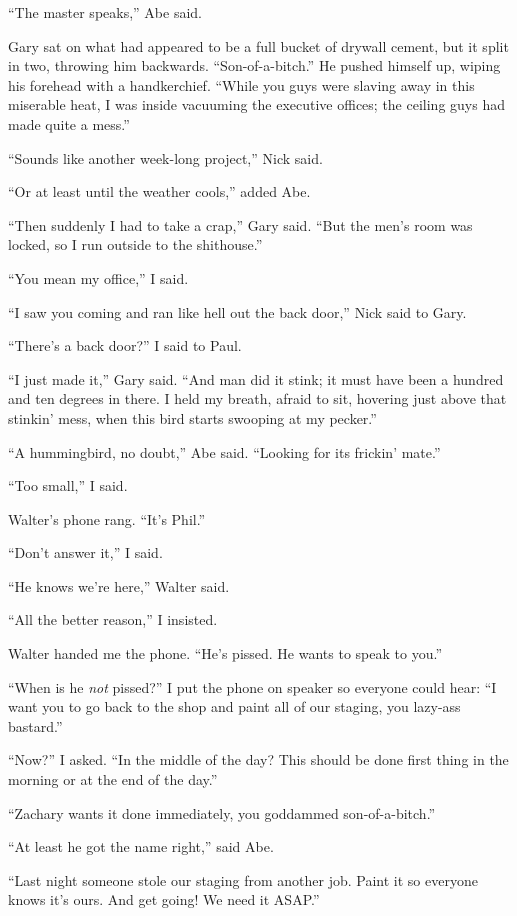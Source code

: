 ``The master speaks,'' Abe said.

Gary sat on what had appeared to be a full bucket of drywall cement, but
it split in two, throwing him backwards. ``Son-of-a-bitch.'' He pushed
himself up, wiping his forehead with a handkerchief. ``While you guys
were slaving away in this miserable heat, I was inside vacuuming the
executive offices; the ceiling guys had made quite a mess.''

``Sounds like another week-long project,'' Nick said.

``Or at least until the weather cools,'' added Abe.

``Then suddenly I had to take a crap,'' Gary said. ``But the men's room
was locked, so I run outside to the shithouse.''

``You mean my office,'' I said.

``I saw you coming and ran like hell out the back door,'' Nick said to
Gary.

``There's a back door?'' I said to Paul.

``I just made it,'' Gary said. ``And man did it stink; it must have been
a hundred and ten degrees in there. I held my breath, afraid to sit,
hovering just above that stinkin' mess, when this bird starts swooping
at my pecker.''

``A hummingbird, no doubt,'' Abe said. ``Looking for its frickin'
mate.''

``Too small,'' I said.

Walter's phone rang. ``It's Phil.''

``Don't answer it,'' I said.

``He knows we're here,'' Walter said.

``All the better reason,'' I insisted.

Walter handed me the phone. ``He's pissed. He wants to speak to you.''

``When is he \emph{not} pissed?'' I put the phone on speaker so everyone
could hear: ``I want you to go back to the shop and paint all of our
staging, you lazy-ass bastard.''

``Now?'' I asked. ``In the middle of the day? This should be done first
thing in the morning or at the end of the day.''

``Zachary wants it done immediately, you goddammed son-of-a-bitch.''

``At least he got the name right,'' said Abe.

``Last night someone stole our staging from another job. Paint it so
everyone knows it's ours. And get going! We need it ASAP.''

